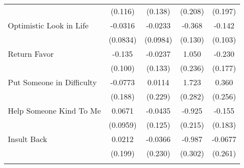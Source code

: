 {\begin{tabular}{l*{4}{c}}
            &     (0.116)         &     (0.138)         &     (0.208)         &     (0.197)         \\
[1em]
Optimistic Look in Life&     -0.0316         &     -0.0233         &      -0.368\sym{**} &      -0.142         \\
            &    (0.0834)         &    (0.0984)         &     (0.130)         &     (0.103)         \\
[1em]
Return Favor&      -0.135         &     -0.0237         &       1.050\sym{***}&      -0.230         \\
            &     (0.100)         &     (0.133)         &     (0.236)         &     (0.177)         \\
[1em]
Put Someone in Difficulty&     -0.0773         &      0.0114         &       1.723\sym{***}&       0.360         \\
            &     (0.188)         &     (0.229)         &     (0.282)         &     (0.256)         \\
[1em]
Help Someone Kind To Me&      0.0671         &     -0.0435         &      -0.925\sym{***}&      -0.155         \\
            &    (0.0959)         &     (0.125)         &     (0.215)         &     (0.183)         \\
[1em]
Insult Back &      0.0212         &     -0.0366         &      -0.987\sym{**} &     -0.0677         \\
            &     (0.199)         &     (0.230)         &     (0.302)         &     (0.261)         \\
\hline\hline
{}\\
\end{tabular}
}

